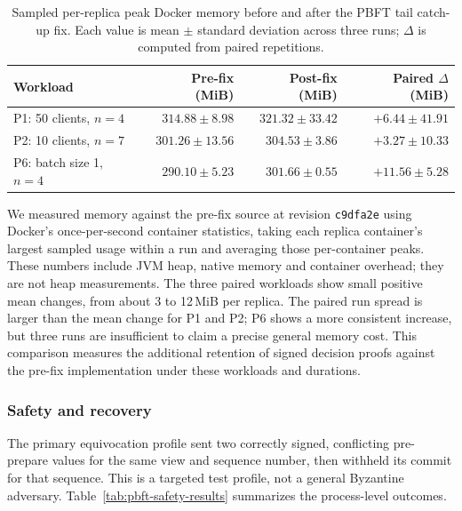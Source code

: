\documentclass[sigconf,a4paper]{acmart}
\begin{document}
    \begin{table}[t]
        \centering
        \small
        \caption{Sampled per-replica peak Docker memory before and after the PBFT tail catch-up fix. Each value is mean $\pm$ standard deviation across three runs; $\Delta$ is computed from paired repetitions.}
        \label{tab:pbft-memory-overhead}
        \begin{tabular}{p{3.7cm}r r r}
            \toprule
            \textbf{Workload} & \textbf{Pre-fix (MiB)} & \textbf{Post-fix (MiB)} & \textbf{Paired $\Delta$ (MiB)} \\
            \midrule
            P1: 50 clients, $n=4$ & $314.88 \pm 8.98$ & $321.32 \pm 33.42$ & $+6.44 \pm 41.91$ \\
            P2: 10 clients, $n=7$ & $301.26 \pm 13.56$ & $304.53 \pm 3.86$ & $+3.27 \pm 10.33$ \\
            P6: batch size 1, $n=4$ & $290.10 \pm 5.23$ & $301.66 \pm 0.55$ & $+11.56 \pm 5.28$ \\
            \bottomrule
        \end{tabular}
    \end{table}

    We measured memory against the pre-fix source at revision \texttt{c9dfa2e}
    using Docker's once-per-second container statistics,
    taking each replica container's largest sampled usage within a run and
    averaging those per-container peaks. These numbers include JVM heap,
    native memory and container overhead; they are not heap measurements. The
    three paired workloads show small positive mean changes, from about 3 to
    12\,MiB per replica. The paired run spread is larger than the mean change
    for P1 and P2; P6 shows a more consistent increase, but three runs are
    insufficient to claim a precise general memory cost. This comparison
    measures the additional retention of signed decision proofs against the
    pre-fix implementation under these workloads and durations.

    \subsubsection{Safety and recovery}
    \label{subsec:eval-pbft-safety}

    The primary equivocation profile sent two correctly signed, conflicting
    pre-prepare values for the same view and sequence number, then withheld its
    commit for that sequence. This is a targeted test profile, not a general
    Byzantine adversary. Table~\ref{tab:pbft-safety-results} summarizes the
    process-level outcomes.
\end{document}
